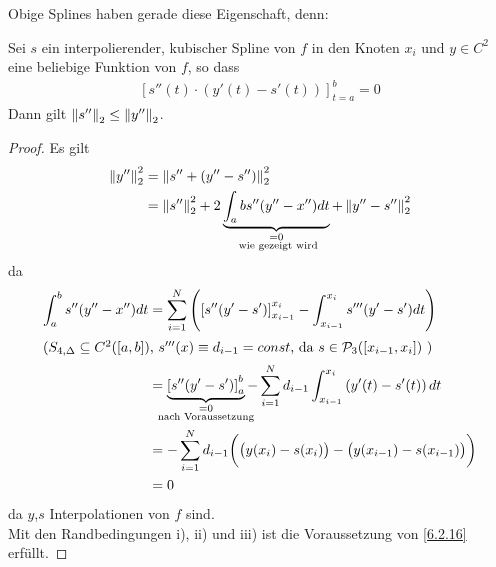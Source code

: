 Obige Splines haben gerade diese Eigenschaft, denn:

\begin{Satze}\label{6.2.16}
  Sei $s$ ein interpolierender, kubischer Spline von $f$
  in den Knoten $x_i $ und $y\in C^2$ eine beliebige Funktion
  von $f$, so dass 
  \begin{gather*}
    \left[s''(t)\cdot(y'(t)-s'(t))\right]_{t=a}^{b}=0
  \end{gather*}
  Dann gilt $\left\| s'' \right\|_2 \leq \left\| y'' \right\|_2$.

  \begin{proof}
    Es gilt
    \begin{align*}
      \nn{y''}_2^2 &= \nn{s''+(y''-s'')}_2^2\\
                   &= \nn{s''}_2^2
                     + 2\underbrace{\int_{a}{b}s''(y''-x'')dt}_{
                     \mathclap{\substack{=0 \\ \text{ wie gezeigt wird}}}
      }
      + \nn{y''-s''}_2^2
    \end{align*}
    da
    \begin{align*}
      \int_{a}^{b} s''(y''-x'')dt &= \sum_{i=1}^{N}\left(\left[
                                    s''(y'-s')\right]_{x_{i-1}}^{x_i}
                                    -\int_{x_{i-1}}^{x_i}s'''(y'-s')dt\right)\\
      \intertext{($S_{4,\Delta}\subseteq C^2([a,b])$, 
      $s'''(x)\equiv d_{i-1}=const$, 
      da 
      $s\in\mathcal{P}_3([x_{i-1},x_i])$ )
      }
                                  &= \underbrace{\left[ s''(y'-s')\right]_{a}^{b}}_{
                                    \mathclap{\substack{ =0 \\ \text{ nach Voraussetzung } }}
      }
      -\sum_{i=1}^{N} d_{i-1}
      \int_{x_{i-1}}^{x_i} \left(y'(t)-s'(t)\right) dt\\
                                  &=-\sum_{i=1}^N d_{i-1}\bigg(\big(y(x_i)-s(x_i)\big)
                                    - \big(y(x_{i-1})-s(x_{i-1})\big)\bigg) \\
                                  &=0
    \end{align*}
    da $y$,$s$ Interpolationen von $f$ sind.\\
    Mit den Randbedingungen i), ii) und iii) 
    ist die Voraussetzung von \ref{6.2.16} erfüllt.
  \end{proof}
\end{Satze}


